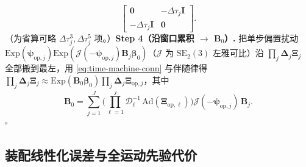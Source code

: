 \begin{derivation}
\begin{equation}
\begin{bmatrix}
  \mathbf{0} & -\Delta\tau_j\mathbf{I}\\
  -\Delta\tau_j\mathbf{I} & \mathbf{0}
  \end{bmatrix}.
  \label{eq:preint-Bj}
\end{equation}
（为省算可略 $\Delta\tau_j^3,\Delta\tau_j^5$ 项。）\textbf{Step 4（沿窗口累积 $\to$ $\mathbf{B}_0$）.}\; 把单步偏置扰动 $\mathrm{Exp}(\boldsymbol{\psi}_{\mathrm{op},j})\mathrm{Exp}(\boldsymbol{\mathcal{J}}(-\boldsymbol{\psi}_{\mathrm{op},j})\mathbf{B}_j\boldsymbol{\beta}_0)$（$\boldsymbol{\mathcal{J}}$ 为 $\mathrm{SE}_2(3)$ 左雅可比）沿 $\prod_j\boldsymbol{\Delta}_j\boldsymbol{\Xi}_j$ 全部搬到最左，用 \cref{eq:time-machine-conn} 与伴随律得 $\prod_j\boldsymbol{\Delta}_j\boldsymbol{\Xi}_j\approx\mathrm{Exp}(\mathbf{B}_0\boldsymbol{\beta}_0)\prod_j\boldsymbol{\Delta}_j\boldsymbol{\Xi}_{\mathrm{op},j}$，其中
\begin{equation}
  \mathbf{B}_0=\sum_{j=1}^{J}\Big(\prod_{\ell=1}^{j}\boldsymbol{\mathcal{D}}_\ell^{-1}\,\mathrm{Ad}(\boldsymbol{\Xi}_{\mathrm{op},\ell})\Big)\boldsymbol{\mathcal{J}}(-\boldsymbol{\psi}_{\mathrm{op},j})\,\mathbf{B}_j.
  \label{eq:preint-B0}
\end{equation}
$\square$
\end{derivation}

\subsection{装配线性化误差与全运动先验代价}
\label{subsec:preint-assemble}


